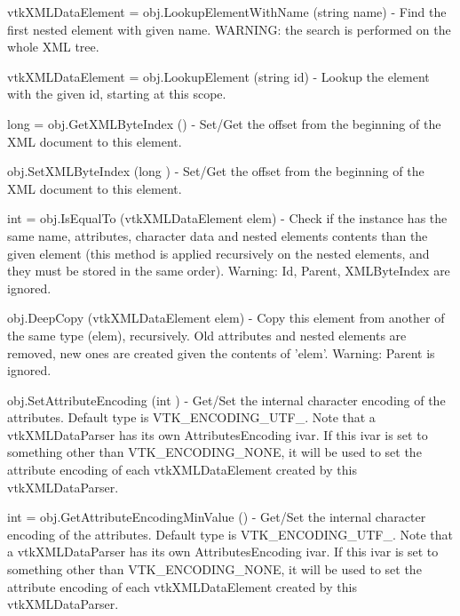 \begin{DoxyItemize}
\item {\ttfamily vtk\-X\-M\-L\-Data\-Element = obj.\-Lookup\-Element\-With\-Name (string name)} -\/ Find the first nested element with given name. W\-A\-R\-N\-I\-N\-G\-: the search is performed on the whole X\-M\-L tree.  
\item {\ttfamily vtk\-X\-M\-L\-Data\-Element = obj.\-Lookup\-Element (string id)} -\/ Lookup the element with the given id, starting at this scope.  
\item {\ttfamily long = obj.\-Get\-X\-M\-L\-Byte\-Index ()} -\/ Set/\-Get the offset from the beginning of the X\-M\-L document to this element.  
\item {\ttfamily obj.\-Set\-X\-M\-L\-Byte\-Index (long )} -\/ Set/\-Get the offset from the beginning of the X\-M\-L document to this element.  
\item {\ttfamily int = obj.\-Is\-Equal\-To (vtk\-X\-M\-L\-Data\-Element elem)} -\/ Check if the instance has the same name, attributes, character data and nested elements contents than the given element (this method is applied recursively on the nested elements, and they must be stored in the same order). Warning\-: Id, Parent, X\-M\-L\-Byte\-Index are ignored.  
\item {\ttfamily obj.\-Deep\-Copy (vtk\-X\-M\-L\-Data\-Element elem)} -\/ Copy this element from another of the same type (elem), recursively. Old attributes and nested elements are removed, new ones are created given the contents of 'elem'. Warning\-: Parent is ignored.  
\item {\ttfamily obj.\-Set\-Attribute\-Encoding (int )} -\/ Get/\-Set the internal character encoding of the attributes. Default type is V\-T\-K\-\_\-\-E\-N\-C\-O\-D\-I\-N\-G\-\_\-\-U\-T\-F\-\_. Note that a vtk\-X\-M\-L\-Data\-Parser has its own Attributes\-Encoding ivar. If this ivar is set to something other than V\-T\-K\-\_\-\-E\-N\-C\-O\-D\-I\-N\-G\-\_\-\-N\-O\-N\-E, it will be used to set the attribute encoding of each vtk\-X\-M\-L\-Data\-Element created by this vtk\-X\-M\-L\-Data\-Parser.  
\item {\ttfamily int = obj.\-Get\-Attribute\-Encoding\-Min\-Value ()} -\/ Get/\-Set the internal character encoding of the attributes. Default type is V\-T\-K\-\_\-\-E\-N\-C\-O\-D\-I\-N\-G\-\_\-\-U\-T\-F\-\_. Note that a vtk\-X\-M\-L\-Data\-Parser has its own Attributes\-Encoding ivar. If this ivar is set to something other than V\-T\-K\-\_\-\-E\-N\-C\-O\-D\-I\-N\-G\-\_\-\-N\-O\-N\-E, it will be used to set the attribute encoding of each vtk\-X\-M\-L\-Data\-Element created by this vtk\-X\-M\-L\-Data\-Parser.  

\end{DoxyItemize}
